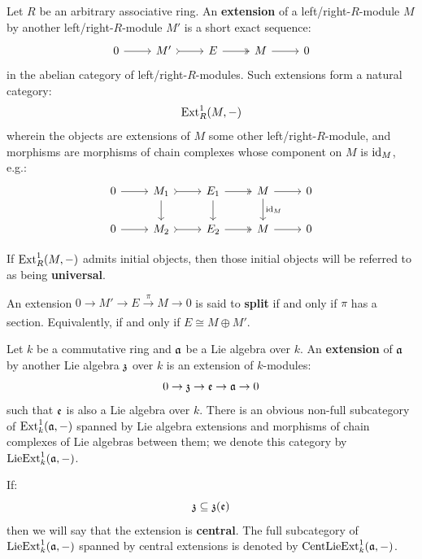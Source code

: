         \begin{definition}
            Let $R$ be an arbitrary associative ring. An \textbf{extension} of a left/right-$R$-module $M$ by another left/right-$R$-module $M'$ is a short exact sequence:
                $$
                    \begin{tikzcd}
                	0 & {M'} & E & M & 0
                	\arrow[from=1-1, to=1-2]
                	\arrow[tail, from=1-2, to=1-3]
                	\arrow[two heads, from=1-3, to=1-4]
                	\arrow[from=1-4, to=1-5]
                    \end{tikzcd}
                $$
            in the abelian category of left/right-$R$-modules. Such extensions form a natural category:
                $$\mathrm{Ext}_R^1(M, -)$$
            wherein the objects are extensions of $M$ some other left/right-$R$-module, and morphisms are morphisms of chain complexes whose component on $M$ is $\mathrm{id}_M$, e.g.:
                $$
                    \begin{tikzcd}
                	0 & {M_1} & {E_1} & M & 0 \\
                	0 & {M_2} & {E_2} & M & 0
                	\arrow[from=1-1, to=1-2]
                	\arrow[tail, from=1-2, to=1-3]
                	\arrow[two heads, from=1-3, to=1-4]
                	\arrow[from=1-4, to=1-5]
                	\arrow[from=2-1, to=2-2]
                	\arrow[tail, from=2-2, to=2-3]
                	\arrow[two heads, from=2-3, to=2-4]
                	\arrow[from=2-4, to=2-5]
                	\arrow["{}", from=1-2, to=2-2]
                	\arrow["{\id_M}", from=1-4, to=2-4]
                	\arrow[from=1-3, to=2-3]
                    \end{tikzcd}
                $$
                
            If $\mathrm{Ext}_R^1(M, -)$ admits initial objects, then those initial objects will be referred to as being \textbf{universal}. 

            An extension $0 \to M' \to E \xrightarrow[]{\pi} M \to 0$ is said to \textbf{split} if and only if $\pi$ has a section. Equivalently, if and only if $E \cong M \oplus M'$. 
        \end{definition}
        \begin{definition}
            Let $k$ be a commutative ring and $\mathfrak{a}$ be a Lie algebra over $k$. An \textbf{extension} of $\mathfrak{a}$ by another Lie algebra $\mathfrak{z}$ over $k$ is an extension of $k$-modules:
                $$0 \to \mathfrak{z} \to \mathfrak{e} \to \mathfrak{a} \to 0$$
            such that $\mathfrak{e}$ is also a Lie algebra over $k$. There is an obvious non-full subcategory of $\mathrm{Ext}^1_k(\mathfrak{a}, -)$ spanned by Lie algebra extensions and morphisms of chain complexes of Lie algebras between them; we denote this category by $\mathrm{Lie}\mathrm{Ext}^1_k(\mathfrak{a}, -)$.
            
            If:
                $$\mathfrak{z} \subseteq \mathfrak{z}(\mathfrak{e})$$
            then we will say that the extension is \textbf{central}. The full subcategory of $\mathrm{Lie}\mathrm{Ext}^1_k(\mathfrak{a}, -)$ spanned by central extensions is denoted by $\mathrm{Cent}\mathrm{Lie}\mathrm{Ext}^1_k(\mathfrak{a}, -)$.  
        \end{definition}
